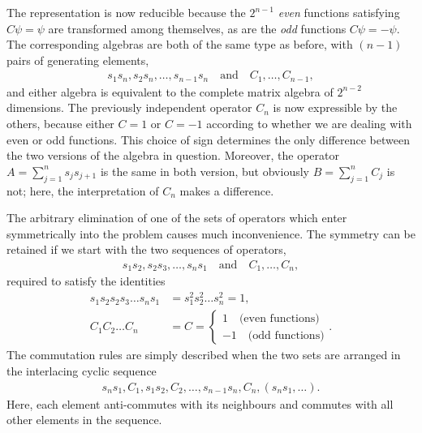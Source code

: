 \documentclass[english, parskip=full]{scrartcl}
\begin{document}
The representation is now reducible because the $2^{n-1}$ \emph{even} functions satisfying $C\psi = \psi$ are transformed among themselves, as are the \emph{odd} functions $C\psi = -\psi$.
The corresponding algebras are both of the same type as before, with $(n-1)$ pairs of generating elements,
\begin{align}
s_1s_n, s_2s_n, \dots, s_{n-1} s_n \quad \text{and}\quad C_1, \dots, C_{n-1},
\end{align}
and either algebra is equivalent to the complete matrix algebra of $2^{n-2}$ dimensions.
The previously independent operator $C_n$ is now expressible by the others, because either $C=1$ or $C=-1$ according to whether we are dealing with even or odd functions.
This choice of sign determines the only difference between the two versions of the algebra in question.
Moreover, the operator $A = \sum_{j=1}^n s_js_{j+1} $ is the same in both version, but obviously $B=\sum_{j=1}^nC_j$ is not; here, the interpretation of $C_n$ makes a difference.

The arbitrary elimination of one of the sets of operators which enter symmetrically into the problem causes much inconvenience.
The symmetry can be retained if we start with the two sequences of operators, 
\begin{align}
s_1s_2,s_2s_3,\dots, s_ns_1\quad\text{and}\quad C_1,\dots, C_n,
\end{align}
required to satisfy the identities
\begin{align}
s_1s_2s_2s_3 \dots s_ns_1 &= s_1^2s_2^2 \dots s_n^2 = 1,\\
C_1C_2 \dots C_n &= C = \begin{cases} 1 \quad \text{(even functions)}\\ -1 \quad \text{(odd functions)}\end{cases}.
\end{align}
The commutation rules are simply described when the two sets are arranged in the interlacing cyclic sequence
\begin{align}
s_ns_1, C_1, s_1s_2,C_2,\dots, s_{n-1}s_n, C_n, (s_ns_1,\dots).
\end{align}
Here, each element anti-commutes with its neighbours and commutes with all other elements in the sequence.
\end{document}
